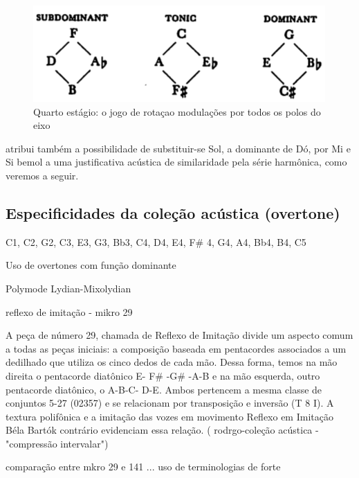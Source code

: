 \documentclass[
	12pt,				%
	openright,			%
	twoside,			%
	a4paper,			%
	english,			%
	french,				%
	spanish,			%
	brazil				%
	]{abntex2}
\begin{document}
\begin{figure}[!h]
	\caption{\label{fig_grafico}Quarto estágio: o jogo de rotaçao modulações por todos os polos do eixo }
	\begin{center}
	    \includegraphics[scale=0.5]{axis/estagio04.png}
	\end{center}
\end{figure}

 atribui também a possibilidade de substituir-se Sol, a dominante de Dó, por Mi e Si bemol a uma justificativa acústica de similaridade pela série harmônica, como veremos a seguir. 




\subsection{Especificidades da coleção acústica (overtone)}

C1, C2, G2, C3, E3, G3, Bb3, C4, D4, E4, F\# 4, G4, A4, Bb4, B4, C5

Uso de overtones com função dominante


Polymode  Lydian-Mixolydian
\cite{suchoff2004bartok}

reflexo de imitação - mikro 29

A peça de número 29, chamada de Reflexo de Imitação divide um aspecto
comum a todas as peças iniciais: a composição baseada em pentacordes associados a um
dedilhado que utiliza os cinco dedos de cada mão. Dessa forma, temos na mão direita o
pentacorde diatônico E- F\# -G\# -A-B e na mão esquerda, outro pentacorde diatônico, o A-B-C-
D-E. Ambos pertencem a mesma classe de conjuntos 5-27 (02357) e se relacionam por
transposição e inversão (T 8 I). A textura
polifônica
e a imitação das vozes em movimento
Reflexo
em Imitação
Béla Bartók
contrário evidenciam essa relação.
( rodrgo-coleção acústica - "compressão intervalar")


comparação entre mkro 29 e 141 ... uso de terminologias de forte
\cite[p. 126]{tymoczko2011geometry}
\end{document}
